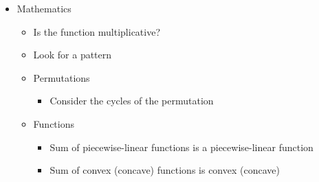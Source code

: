 \documentclass[9pt,a4paper,twocolumn,landscape,oneside]{amsart}
\newenvironment{myitemize}
{ \begin{itemize}[leftmargin=.5cm]
    \setlength{\itemsep}{0pt}
    \setlength{\parskip}{0pt}
    \setlength{\parsep}{0pt}     }
{ \end{itemize}                  }
\begin{document}
\begin{multicols*}{3}
\begin{myitemize}
\begin{itemize}
\begin{itemize}
                            \end{itemize}
                        \item Eulerian path/circuit
                        \item Chinese postman problem
                        \item Topological sort
                        \item (Min-Cost) Max Flow
                        \item Min Cut
                            \begin{itemize}
                                \item Maximum Density Subgraph
                            \end{itemize}
                        \item Huffman Coding
                        \item Min-Cost Arborescence
                        \item Steiner Tree
                        \item Kirchoff's matrix tree theorem
                        \item Pr\"ufer sequences
                        \item Lov\'asz Toggle
                        \item Look at the DFS tree (which has no cross-edges)
                    \end{itemize}
                \item Mathematics
                    \begin{itemize}
                        \item Is the function multiplicative?
                        \item Look for a pattern
                        \item Permutations
                            \begin{itemize}
                                \item Consider the cycles of the permutation
                            \end{itemize}
                        \item Functions
                            \begin{itemize}
                                \item Sum of piecewise-linear functions is a piecewise-linear function
                                \item Sum of convex (concave) functions is convex (concave)

\end{itemize}
\end{itemize}
\end{myitemize}
\end{multicols*}
\end{document}

